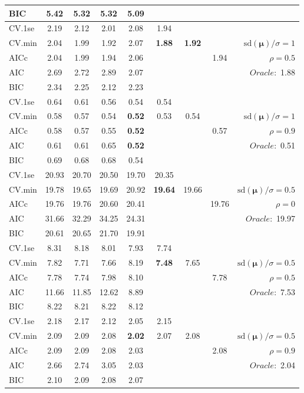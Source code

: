 \begin{table}
\begin{center}
\begin{tabular}{l*{7}{c}|r}
BIC & 5.42 & 5.32 & 5.32 & 5.09 & & & &  \\
 \hline 
CV.1se & 2.19 & 2.12 & 2.01 & 2.08 & 1.94 & & & \\
CV.min & 2.04 & 1.99 & 1.92 & 2.07 & {\bf 1.88} & {\bf 1.92} & & $\mathrm{sd}(\mathbf{\mu})/\sigma=1$ \\
AICc & 2.04 & 1.99 & 1.94 & 2.06 & & & 1.94 &  $\rho=0.5$ \\
AIC & 2.69 & 2.72 & 2.89 & 2.07 & & & &  \multirow{2}{*}{$Oracle: $ 1.88} \\
BIC & 2.34 & 2.25 & 2.12 & 2.23 & & & &  \\
 \hline 
CV.1se & 0.64 & 0.61 & 0.56 & 0.54 & 0.54 & & & \\
CV.min & 0.58 & 0.57 & 0.54 & {\bf 0.52} & 0.53 & 0.54 & & $\mathrm{sd}(\mathbf{\mu})/\sigma=1$ \\
AICc & 0.58 & 0.57 & 0.55 & {\bf 0.52} & & & 0.57 &  $\rho=0.9$ \\
AIC & 0.61 & 0.61 & 0.65 & {\bf 0.52} & & & &  \multirow{2}{*}{$Oracle: $ 0.51} \\
BIC & 0.69 & 0.68 & 0.68 & 0.54 & & & &  \\
 \hline 
CV.1se & 20.93 & 20.70 & 20.50 & 19.70 & 20.35 & & & \\
CV.min & 19.78 & 19.65 & 19.69 & 20.92 & {\bf 19.64} & 19.66 & & $\mathrm{sd}(\mathbf{\mu})/\sigma=0.5$ \\
AICc & 19.76 & 19.76 & 20.60 & 20.41 & & & 19.76 &  $\rho=0$ \\
AIC & 31.66 & 32.29 & 34.25 & 24.31 & & & &  \multirow{2}{*}{$Oracle: $ 19.97} \\
BIC & 20.61 & 20.65 & 21.70 & 19.91 & & & &  \\
 \hline 
CV.1se & 8.31 & 8.18 & 8.01 & 7.93 & 7.74 & & & \\
CV.min & 7.82 & 7.71 & 7.66 & 8.19 & {\bf 7.48} & 7.65 & & $\mathrm{sd}(\mathbf{\mu})/\sigma=0.5$ \\
AICc & 7.78 & 7.74 & 7.98 & 8.10 & & & 7.78 &  $\rho=0.5$ \\
AIC & 11.66 & 11.85 & 12.62 & 8.89 & & & &  \multirow{2}{*}{$Oracle: $ 7.53} \\
BIC & 8.22 & 8.21 & 8.22 & 8.12 & & & &  \\
 \hline 
CV.1se & 2.18 & 2.17 & 2.12 & 2.05 & 2.15 & & & \\
CV.min & 2.09 & 2.09 & 2.08 & {\bf 2.02} & 2.07 & 2.08 & & $\mathrm{sd}(\mathbf{\mu})/\sigma=0.5$ \\
AICc & 2.09 & 2.09 & 2.08 & 2.03 & & & 2.08 &  $\rho=0.9$ \\
AIC & 2.66 & 2.74 & 3.05 & 2.03 & & & &  \multirow{2}{*}{$Oracle: $ 2.04} \\
BIC & 2.10 & 2.09 & 2.08 & 2.07 & & & &  \\
 \hline 
\end{tabular}
\end{center}
\vspace{-1cm}
\end{table}




